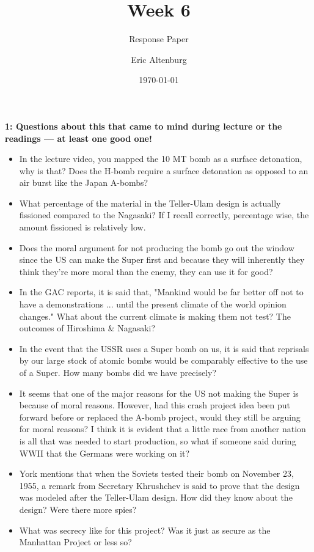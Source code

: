 \documentclass[12pt]{turabian-researchpaper}
\title{Week 6}
\subtitle{Response Paper}
\author{Eric Altenburg}
\date{\today}
\newcommand\question[2]{\noindent\textbf{#1: #2}}
\begin{document}
	\maketitle

	\question{1}{Questions about this that came to mind during lecture or the readings — at least one good one!}

		\begin{itemize}
			\item In the lecture video, you mapped the 10 MT bomb as a surface detonation, why is that? Does the H-bomb require a surface detonation as opposed to an air burst like the Japan A-bombs?
			\item What percentage of the material in the Teller-Ulam design is actually fissioned compared to the Nagasaki? If I recall correctly, percentage wise, the amount fissioned is relatively low.
			\item Does the moral argument for not producing the bomb go out the window since the US can make the Super first and because they will inherently they think they're more moral than the enemy, they can use it for good?
			\item In the GAC reports, it is said that, "Mankind would be far better off not to have a demonstrations ... until the present climate of the world opinion changes." What about the current climate is making them not test? The outcomes of Hiroshima \& Nagasaki?
			\item In the event that the USSR uses a Super bomb on us, it is said that reprisals by our large stock of atomic bombs would be comparably effective to the use of a Super. How many bombs did we have precisely?
			\item It seems that one of the major reasons for the US not making the Super is because of moral reasons. However, had this crash project idea been put forward before or replaced the A-bomb project, would they still be arguing for moral reasons? I think it is evident that a little race from another nation is all that was needed to start production, so what if someone said during WWII that the Germans were working on it?
			\item York mentions that when the Soviets tested their bomb on November 23, 1955, a remark from Secretary Khrushchev is said to prove that the design was modeled after the Teller-Ulam design. How did they know about the design? Were there more spies?
			\item What was secrecy like for this project? Was it just as secure as the Manhattan Project or less so?
		\end{itemize}
\end{document}
